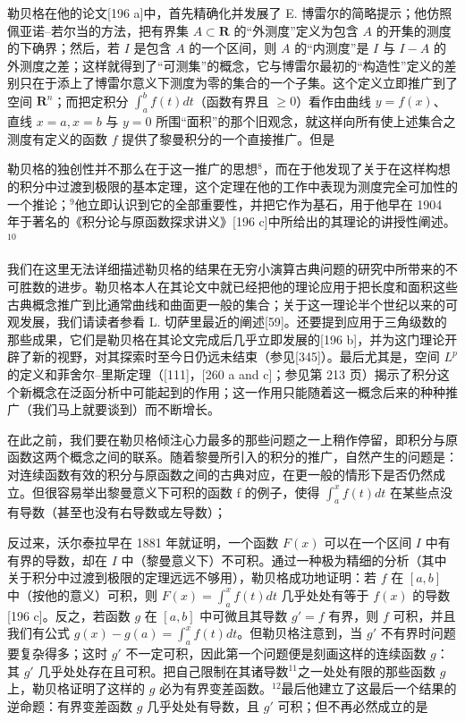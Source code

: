 勒贝格在他的论文{[}196 a{]}中，首先精确化并发展了 E. 博雷尔的简略提示；他仿照佩亚诺–若尔当的方法，把有界集 \(A \subset \mathbf{R}\) 的“外测度”定义为包含 \(A\) 的开集的测度的下确界；然后，若 \(I\) 是包含 \(A\) 的一个区间，则 \(A\) 的“内测度”是 \(I\) 与 \(I - A\) 的外测度之差；这样就得到了“可测集”的概念，它与博雷尔最初的“构造性”定义的差别只在于添上了博雷尔意义下测度为零的集合的一个子集。这个定义立即推广到了空间 \(\mathbf{R}^n\)；而把定积分 \(\int_{a}^{b} f(t) dt\)（函数有界且 \(\geq 0\)）看作由曲线 \(y = f(x)\)、直线 \(x = a, x = b\) 与 \(y = 0\) 所围“面积”的那个旧观念，就这样向所有使上述集合之测度有定义的函数 \(f\) 提供了黎曼积分的一个直接推广。但是

勒贝格的独创性并不那么在于这一推广的思想\(^{8}\)，而在于他发现了关于在这样构想的积分中过渡到极限的基本定理，这个定理在他的工作中表现为测度完全可加性的一个推论；\(^{9}\)他立即认识到它的全部重要性，并把它作为基石，用于他早在 1904 年于著名的《积分论与原函数探求讲义》{[}196 c{]}中所给出的其理论的讲授性阐述。\(^{10}\)

我们在这里无法详细描述勒贝格的结果在无穷小演算古典问题的研究中所带来的不可胜数的进步。勒贝格本人在其论文中就已经把他的理论应用于把长度和面积这些古典概念推广到比通常曲线和曲面更一般的集合；关于这一理论半个世纪以来的可观发展，我们请读者参看 L. 切萨里最近的阐述{[}59{]}。还要提到应用于三角级数的那些成果，它们是勒贝格在其论文完成后几乎立即发展的{[}196 b{]}，并为这门理论开辟了新的视野，对其探索时至今日仍远未结束（参见{[}345{]}）。最后尤其是，空间 \(L^p\) 的定义和菲舍尔–里斯定理（{[}111{]}，{[}260 a and c{]}；参见第 213 页）揭示了积分这个新概念在泛函分析中可能起到的作用；这一作用只能随着这一概念后来的种种推广（我们马上就要谈到）而不断增长。

在此之前，我们要在勒贝格倾注心力最多的那些问题之一上稍作停留，即积分与原函数这两个概念之间的联系。随着黎曼所引入的积分的推广，自然产生的问题是：对连续函数有效的积分与原函数之间的古典对应，在更一般的情形下是否仍然成立。但很容易举出黎曼意义下可积的函数 f 的例子，使得 \(\int_{a}^{x}f(t)dt\) 在某些点没有导数（甚至也没有右导数或左导数）；

反过来，沃尔泰拉早在 1881 年就证明，一个函数 \(F(x)\) 可以在一个区间 \(I\) 中有有界的导数，却在 \(I\) 中（黎曼意义下）不可积。通过一种极为精细的分析（其中关于积分中过渡到极限的定理远远不够用），勒贝格成功地证明：若 \(f\) 在 \([a,b]\) 中（按他的意义）可积，则 \(F(x) = \int_{a}^{x} f(t) dt\) 几乎处处有等于 \(f(x)\) 的导数{[}196 c{]}。反之，若函数 \(g\) 在 \([a,b]\) 中可微且其导数 \(g' = f\) 有界，则 \(f\) 可积，并且我们有公式 \(g(x) - g(a) = \int_{a}^{x} f(t) dt\)。但勒贝格注意到，当 \(g'\) 不有界时问题要复杂得多；这时 \(g'\) 不一定可积，因此第一个问题便是刻画这样的连续函数 \(g\)：其 \(g'\) 几乎处处存在且可积。把自己限制在其诸导数\(^{11}\)之一处处有限的那些函数 \(g\) 上，勒贝格证明了这样的 \(g\) 必为有界变差函数。\(^{12}\)最后他建立了这最后一个结果的逆命题：有界变差函数 \(g\) 几乎处处有导数，且 \(g'\) 可积；但不再必然成立的是


